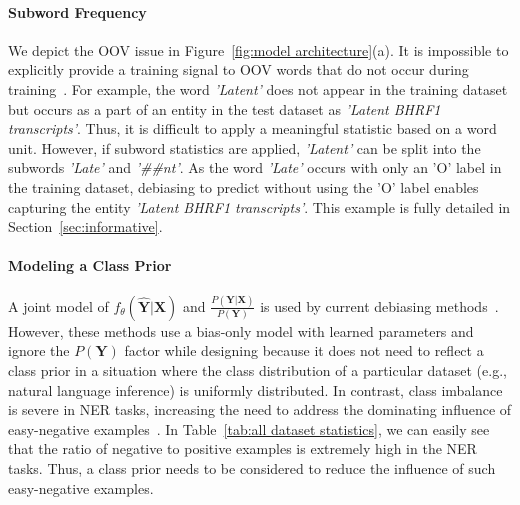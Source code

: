 \documentclass[11pt]{article}
\begin{document}
\paragraph{Subword Frequency}
\label{sec:subword}
We depict the OOV issue in Figure~\ref{fig:model architecture}(a).
It is impossible to explicitly provide a training signal to OOV words that do not occur during training~\cite{leevy2018survey, li2020dice}.
For example, the word \textit{'Latent'} does not appear in the training dataset but occurs as a part of an entity in the test dataset as \textit{'Latent BHRF1 transcripts'}. 
Thus, it is difficult to apply a meaningful statistic based on a word unit.
However, if subword statistics are applied, \textit{'Latent'} can be split into the subwords \textit{'Late'} and \textit{'\#\#nt'}.
As the word \textit{'Late'} occurs with only an 'O' label in the training dataset, debiasing to predict without using the 'O' label enables capturing the entity \textit{'Latent BHRF1 transcripts'}.
This example is fully detailed in Section~\ref{sec:informative}.


\paragraph{Modeling a Class Prior}
\label{sec:classprior}
A joint model of $f_\theta(\hat{\textbf{Y}}|\textbf{X})$ and $\frac{P(\textbf{Y}|\textbf{X})}{P(\textbf{Y})}$ is used by current debiasing methods~\cite{clark2019don}.
However, these methods use a bias-only model with learned parameters and ignore the $P(\textbf{Y})$ factor while designing because it does not need to reflect a class prior in a situation where the class distribution of a particular dataset (e.g., natural language inference) is uniformly distributed.
In contrast, class imbalance is severe in NER tasks, increasing the need to address the dominating influence of easy-negative examples~\cite{meng2019dsreg,li2020dice,mahabadi2020end}.
In Table~\ref{tab:all dataset statistics}, we can easily see that the ratio of negative to positive examples is extremely high in the NER tasks.
Thus, a class prior needs to be considered to reduce the influence of such easy-negative examples.
\end{document}
